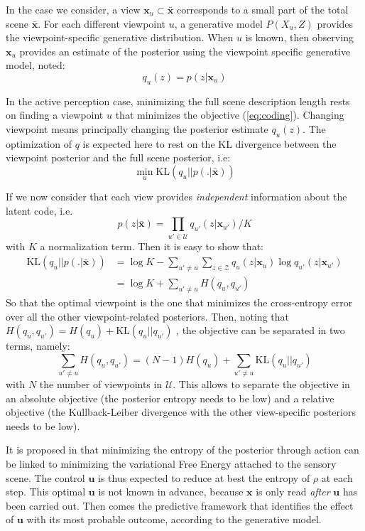 \documentclass{article}
\begin{document}
In the case we consider, a view $\boldsymbol{x}_u \subset \bar{\boldsymbol{x}}$ corresponds to a small part of the total scene $\bar{\boldsymbol{x}}$. For each different viewpoint $u$, a  generative model $P(X_u, Z)$ provides the viewpoint-specific generative  distribution. When $u$ is known, then observing $\boldsymbol{x}_u$ provides an estimate of the posterior using the viewpoint specific generative model, noted: 
$$q_u(z) = p(z|\boldsymbol{x}_u)$$

In the active perception case, minimizing the full scene description length rests on finding a viewpoint $u$  that minimizes the objective (\ref{eq:coding}). Changing viewpoint means principally changing the posterior estimate $q_u(z)$. The optimization of $q$ is expected here to rest on the KL divergence between the viewpoint posterior and the full scene posterior, i.e:
$$\min_u \text{KL} (q_u||p(.|\bar{\boldsymbol{x}}))$$ 

If we now consider that each view provides \emph{independent} information about the latent code, i.e.  $$p(z|\bar{\boldsymbol{x}}) = \prod_{u'\in \mathcal{U}} q_{u'}(z|\boldsymbol{x}_{u'}) /K$$ 
with $K$ a normalization term. Then it is easy to show that:
\begin{align}
\text{KL}(q_u||p(.|\bar{\boldsymbol{x}})) 
&= \log K - \sum_{u' \neq u} \sum_{z \in \mathcal{Z}} q_u(z|\boldsymbol{x}_u) \log q_{u'}(z|\boldsymbol{x}_{u'})\nonumber\\
&= \log K + \sum_{u' \neq u} H(q_u, q_{u'})
\end{align}
So that the optimal viewpoint is the one that minimizes the cross-entropy error over all the other viewpoint-related posteriors. 
Then, noting that $H(q_u, q_{u'}) = H(q_u) + \text{KL}(q_u||q_{u'})$ , the objective can be separated in two terms, namely:
$$\sum_{u' \neq u} H(q_u, q_{u'}) = (N - 1) H(q_u) + \sum_{u' \neq u} \text{KL}(q_u||q_{u'})$$
with $N$ the number of viewpoints in $\mathcal{U}$.
This allows to separate the objective in an absolute objective (the posterior entropy needs to be low) and a relative objective (the Kullback-Leiber divergence with the other view-specific posteriors needs to be low).

It is proposed in \cite{friston2012perceptions} that minimizing the entropy of the posterior through action can be linked to minimizing the variational Free Energy attached to the sensory scene. 
The control $\boldsymbol{u}$ is thus expected to reduce at best the entropy of $\rho$ at each step. This optimal $\boldsymbol{u}$ is not known in advance, because $\boldsymbol{x}$ is only read \emph{after} $\boldsymbol{u}$ has been carried out. Then comes the predictive framework that identifies the effect of $\boldsymbol{u}$ with its most probable outcome, according to the generative model.
\end{document}
